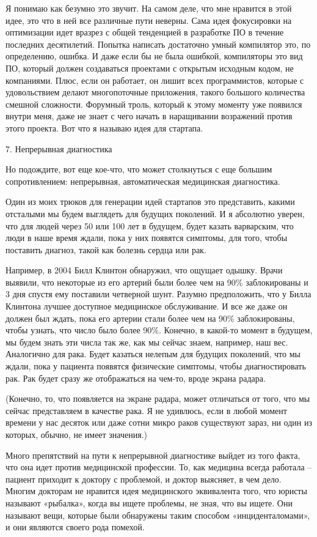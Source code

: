 \documentclass[ebook,12pt,oneside,openany]{memoir}
\begin{document}
Я понимаю как безумно это звучит. На самом деле, что мне нравится в
этой идее, это что в ней все различные пути неверны. Сама идея
фокусировки на оптимизации идет вразрез с общей тенденцией в
разработке ПО в течение последних десятилетий. Попытка написать
достаточно умный компилятор это, по определению, ошибка. И даже если
бы не была ошибкой, компиляторы это вид ПО, который должен создаваться
проектами с открытым исходным кодом, не компаниями. Плюс, если он
работает, он лишит всех программистов, которые с удовольствием делают
многопоточные приложения, такого большого количества смешной
сложности. Форумный троль, который к этому моменту уже появился внутри
меня, даже не знает с чего начать в наращивании возражений против
этого проекта. Вот что я называю идея для стартапа.

7. Непрерывная диагностика

Но подождите, вот еще кое-что, что может столкнуться с еще большим
сопротивлением: непрерывная, автоматическая медицинская диагностика.

Один из моих трюков для генерации идей стартапов это представить,
какими отсталыми мы будем выглядеть для будущих поколений. И я
абсолютно уверен, что для людей через 50 или 100 лет в будущем, будет
казать варварским, что люди в наше время ждали, пока у них появятся
симптомы, для того, чтобы поставить диагноз, такой как болезнь сердца
или рак.

Например, в 2004 Билл Клинтон обнаружил, что ощущает одышку. Врачи
выявили, что некоторые из его артерий были более чем на 90\%
заблокированы и 3 дня спустя ему поставили четверной шунт. Разумно
предположить, что у Билла Клинтона лучшее доступное медицинское
обслуживание. И все же даже он должен был ждать, пока его артерии
стали более чем на 90\% заблокированы, чтобы узнать, что число было
более 90\%. Конечно, в какой-то момент в будущем, мы будем знать эти
числа так же, как мы сейчас знаем, например, наш вес. Аналогично для
рака. Будет казаться нелепым для будущих поколений, что мы ждали, пока
у пациента появятся физические симптомы, чтобы диагностировать рак.
Рак будет сразу же отображаться на чем-то, вроде экрана радара.

(Конечно, то, что появляется на экране радара, может отличаться от
того, что мы сейчас представляем в качестве рака. Я не удивлюсь, если
в любой момент времени у нас десяток или даже сотни микро раков
существуют зараз, ни один из которых, обычно, не имеет значения.)

Много препятствий на пути к непрерывной диагностике выйдет из того
факта, что она идет против медицинской профессии. То, как медицина
всегда работала – пациент приходит к доктору с проблемой, и доктор
выясняет, в чем дело. Многим докторам не нравится идея медицинского
эквивалента того, что юристы называют «рыбалка», когда вы ищете
проблемы, не зная, что вы ищете. Они называют вещи, которые были
обнаружены таким способом «инциденталомами», и они являются своего
рода помехой.
\end{document}
